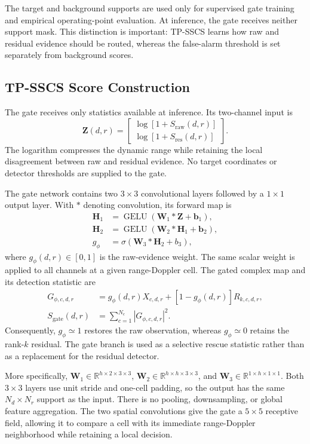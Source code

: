 \documentclass[journal]{IEEEtran}
\begin{document}
The target and background supports are used only for supervised gate training and empirical operating-point evaluation. At inference, the gate receives neither support mask. This distinction is important: TP-SSCS learns how raw and residual evidence should be routed, whereas the false-alarm threshold is set separately from background scores.

\subsection{TP-SSCS Score Construction}

The gate receives only statistics available at inference. Its two-channel input is
\begin{equation}
    \bm{Z}(d,r)=
    \begin{bmatrix}
    \log[1+S_{\mathrm{raw}}(d,r)]\\
    \log[1+S_{\mathrm{res}}(d,r)]
    \end{bmatrix}.
\end{equation}
The logarithm compresses the dynamic range while retaining the local disagreement between raw and residual evidence. No target coordinates or detector thresholds are supplied to the gate.

The gate network contains two $3\times3$ convolutional layers followed by a $1\times1$ output layer. With $*$ denoting convolution, its forward map is
\begin{align}
    \bm{H}_1 & = \operatorname{GELU}(\bm{W}_1*\bm{Z}+\bm{b}_1), \\
    \bm{H}_2 & = \operatorname{GELU}(\bm{W}_2*\bm{H}_1+\bm{b}_2), \\
    g_{\phi} & = \sigma(\bm{W}_3*\bm{H}_2+b_3),
\end{align}
where $g_{\phi}(d,r)\in[0,1]$ is the raw-evidence weight. The same scalar weight is applied to all channels at a given range-Doppler cell. The gated complex map and its detection statistic are
\begin{align}
    G_{\phi,c,d,r} & = g_{\phi}(d,r)X_{c,d,r}
    +[1-g_{\phi}(d,r)]R_{k,c,d,r}, \\
    S_{\mathrm{gate}}(d,r) & =
    \sum_{c=1}^{N_c}|G_{\phi,c,d,r}|^2.
\end{align}
Consequently, $g_{\phi}\simeq1$ restores the raw observation, whereas $g_{\phi}\simeq0$ retains the rank-$k$ residual. The gate branch is used as a selective rescue statistic rather than as a replacement for the residual detector.

More specifically, $\bm{W}_1\in\mathbb{R}^{h\times2\times3\times3}$, $\bm{W}_2\in\mathbb{R}^{h\times h\times3\times3}$, and $\bm{W}_3\in\mathbb{R}^{1\times h\times1\times1}$. Both $3\times3$ layers use unit stride and one-cell padding, so the output has the same $N_d\times N_r$ support as the input. There is no pooling, downsampling, or global feature aggregation. The two spatial convolutions give the gate a $5\times5$ receptive field, allowing it to compare a cell with its immediate range-Doppler neighborhood while retaining a local decision.
\end{document}
